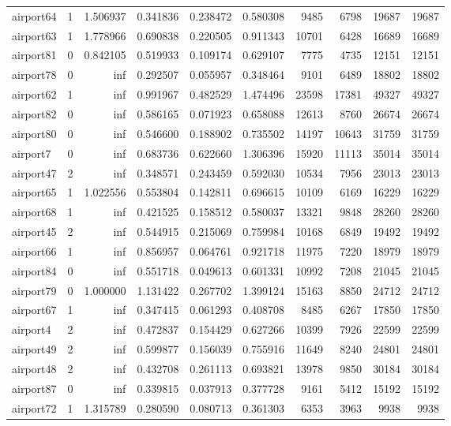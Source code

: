 \begin{longtable}{|l|r|r|r|r|r|r|r|r|r|}
airport64 & 1 & 1.506937 & 0.341836 & 0.238472 & 0.580308 & 9485 & 6798 & 19687 & 19687 \\
airport63 & 1 & 1.778966 & 0.690838 & 0.220505 & 0.911343 & 10701 & 6428 & 16689 & 16689 \\
airport81 & 0 & 0.842105 & 0.519933 & 0.109174 & 0.629107 & 7775 & 4735 & 12151 & 12151 \\
airport78 & 0 & inf & 0.292507 & 0.055957 & 0.348464 & 9101 & 6489 & 18802 & 18802 \\
airport62 & 1 & inf & 0.991967 & 0.482529 & 1.474496 & 23598 & 17381 & 49327 & 49327 \\
airport82 & 0 & inf & 0.586165 & 0.071923 & 0.658088 & 12613 & 8760 & 26674 & 26674 \\
airport80 & 0 & inf & 0.546600 & 0.188902 & 0.735502 & 14197 & 10643 & 31759 & 31759 \\
airport7 & 0 & inf & 0.683736 & 0.622660 & 1.306396 & 15920 & 11113 & 35014 & 35014 \\
airport47 & 2 & inf & 0.348571 & 0.243459 & 0.592030 & 10534 & 7956 & 23013 & 23013 \\
airport65 & 1 & 1.022556 & 0.553804 & 0.142811 & 0.696615 & 10109 & 6169 & 16229 & 16229 \\
airport68 & 1 & inf & 0.421525 & 0.158512 & 0.580037 & 13321 & 9848 & 28260 & 28260 \\
airport45 & 2 & inf & 0.544915 & 0.215069 & 0.759984 & 10168 & 6849 & 19492 & 19492 \\
airport66 & 1 & inf & 0.856957 & 0.064761 & 0.921718 & 11975 & 7220 & 18979 & 18979 \\
airport84 & 0 & inf & 0.551718 & 0.049613 & 0.601331 & 10992 & 7208 & 21045 & 21045 \\
airport79 & 0 & 1.000000 & 1.131422 & 0.267702 & 1.399124 & 15163 & 8850 & 24712 & 24712 \\
airport67 & 1 & inf & 0.347415 & 0.061293 & 0.408708 & 8485 & 6267 & 17850 & 17850 \\
airport4 & 2 & inf & 0.472837 & 0.154429 & 0.627266 & 10399 & 7926 & 22599 & 22599 \\
airport49 & 2 & inf & 0.599877 & 0.156039 & 0.755916 & 11649 & 8240 & 24801 & 24801 \\
airport48 & 2 & inf & 0.432708 & 0.261113 & 0.693821 & 13978 & 9850 & 30184 & 30184 \\
airport87 & 0 & inf & 0.339815 & 0.037913 & 0.377728 & 9161 & 5412 & 15192 & 15192 \\
airport72 & 1 & 1.315789 & 0.280590 & 0.080713 & 0.361303 & 6353 & 3963 & 9938 & 9938 \\

\end{longtable}
